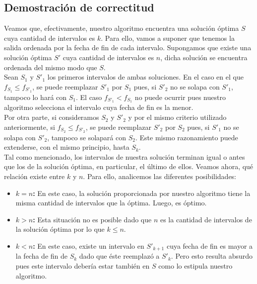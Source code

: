 \subsection{Demostración de correctitud}

Veamos que, efectivamente, nuestro algoritmo encuentra una solución óptima $S$ cuya cantidad de intervalos es $k$. Para ello, vamos a suponer que tenemos la salida ordenada por la fecha de fin de cada intervalo. Supongamos que existe una solución óptima $S'$ cuya cantidad de intervalos es $n$, dicha solución se encuentra ordenada del mismo modo que $S$.\\
\newline
Sean $S_{1}$ y $S'_{1}$ los primeros intervalos de ambas soluciones. En el caso en el que $f_{S_{1}} \leq f_{S'_{1}}$, se puede reemplazar $S'_{1}$ por $S_{1}$ pues, si $S'_{2}$ no se solapa con $S'_{1}$, tampoco lo hará con $S_{1}$. El caso $f_{S'_{1}} < f_{S_{1}}$ no puede ocurrir pues nuestro algoritmo selecciona el intervalo cuya fecha de fin es la menor.\\
\newline
Por otra parte, si consideramos $S_{2}$ y $S'_{2}$ y por el mismo criterio utilizado anteriormente, si $f_{S_{2}} \leq f_{S'_{2}}$, se puede reemplazar $S'_{2}$ por $S_{2}$ pues, si $S'_{1}$ no se solapa con $S'_{2}$, tampoco se solapará con $S_{2}$. Este mismo razonamiento puede extenderse, con el mismo principio, hasta $S_{k}$.\\
\newline
Tal como mencionado, los intervalos de nuestra solución terminan igual o antes que los de la solución óptima, en particular, el último de ellos. Veamos ahora, qué relación existe entre $k$ y $n$. Para ello, analicemos las diferentes posibilidades:
\begin{itemize}
\item \textbf{$k = n$:} En este caso, la solución proporcionada por nuestro algoritmo tiene la misma cantidad de intervalos que la óptima. Luego, es óptimo.
\item \textbf{$k > n$:} Esta situación no es posible dado que $n$ es la cantidad de intervalos de la solución óptima por lo que $k \leq n$.
\item \textbf{$k < n$:} En este caso, existe un intervalo en $S'_{k+1}$ cuya fecha de fin es mayor a la fecha de fin de $S_{k}$ dado que éste reemplazó a $S'_{k}$. Pero esto resulta absurdo pues este intervalo debería estar también en $S$ como lo estipula nuestro algoritmo.
\end{itemize}

